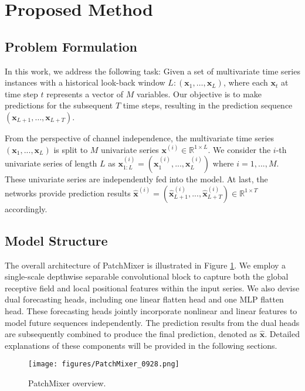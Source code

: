 \documentclass{article} \usepackage{iclr2024_conference,times}
\def\vx{{\bm{x}}}
\newcommand{\R}{\mathbb{R}}
\begin{document}
\section{Proposed Method}

\subsection{Problem Formulation}

In this work, we address the following task: Given a set of multivariate time series instances with a historical look-back window $L: (\vx_1, \ldots, \vx_L)$, where each $\vx_t$ at time step $t$ represents a vector of $M$ variables. Our objective is to make predictions for the subsequent $T$ time steps, resulting in the prediction sequence $(\vx_{L+1}, \ldots, \vx_{L+T})$.

From the perspective of channel independence, the multivariate time series $(\vx_1, ..., \vx_L )$ is split to $M$ univariate series $\vx^{(i)} \in \R^{1 \times L}$. We consider the $i$-th univariate series of length $L$ as $\vx^{(i)}_{1:L} = (\vx_1^{(i)},..., \vx_L^{(i)})$ where $i=1,...,M$. These univariate series are independently fed into the model. At last, the networks provide prediction results $\hat{\vx}^{(i)}= (\hat{\vx}^{(i)}_{L+1},..., \hat{\vx}^{(i)}_{L+T}) \in \R^{1 \times T}$ accordingly.

\subsection{Model Structure}

The overall architecture of PatchMixer is illustrated in Figure \ref{fig::model_overview}. We employ a single-scale depthwise separable convolutional block to capture both the global receptive field and local positional features within the input series. We also devise dual forecasting heads, including one linear flatten head and one MLP flatten head. These forecasting heads jointly incorporate nonlinear and linear features to model future sequences independently. The prediction results from the dual heads are subsequently combined to produce the final prediction, denoted as $\hat{\vx}$. Detailed explanations of these components will be provided in the following sections.

\begin{figure}[h]
\begin{center}
\texttt{[image: figures/PatchMixer\_0928.png]}
\end{center}
\caption{PatchMixer overview.}
\label{fig::model_overview}
\end{figure}
\end{document}
